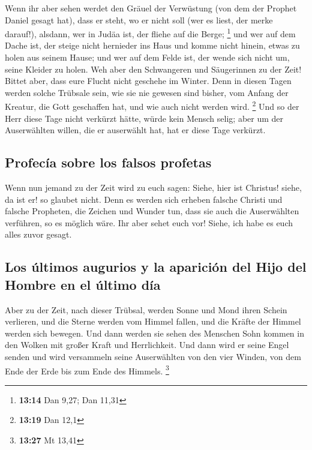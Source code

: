 Wenn ihr aber sehen werdet den Gräuel der Verwüstung
(von dem der Prophet Daniel gesagt hat), dass er steht, wo er nicht soll
(wer es liest, der merke darauf!), alsdann, wer in Judäa ist, der fliehe
auf die Berge; \footnote{\textbf{13:14} Dan 9,27; Dan 11,31}
 und wer auf dem Dache ist, der steige nicht hernieder
ins Haus und komme nicht hinein, etwas zu holen aus seinem Hause;
 und wer auf dem Felde ist, der wende sich nicht um,
seine Kleider zu holen.  Weh aber den Schwangeren und
Säugerinnen zu der Zeit!  Bittet aber, dass eure Flucht
nicht geschehe im Winter.  Denn in diesen Tagen werden
solche Trübsale sein, wie sie nie gewesen sind bisher, vom Anfang der
Kreatur, die Gott geschaffen hat, und wie auch nicht werden wird.
\footnote{\textbf{13:19} Dan 12,1}  Und so der Herr diese
Tage nicht verkürzt hätte, würde kein Mensch selig; aber um der
Auserwählten willen, die er auserwählt hat, hat er diese Tage verkürzt.

\hypertarget{profecuxeda-sobre-los-falsos-profetas}{%
\subsection{Profecía sobre los falsos
profetas}\label{profecuxeda-sobre-los-falsos-profetas}}

 Wenn nun jemand zu der Zeit wird zu euch sagen: Siehe,
hier ist Christus! siehe, da ist er! so glaubet nicht. 
Denn es werden sich erheben falsche Christi und falsche Propheten, die
Zeichen und Wunder tun, dass sie auch die Auserwählten verführen, so es
möglich wäre.  Ihr aber sehet euch vor! Siehe, ich habe
es euch alles zuvor gesagt.

\hypertarget{los-uxfaltimos-augurios-y-la-apariciuxf3n-del-hijo-del-hombre-en-el-uxfaltimo-duxeda}{%
\subsection{Los últimos augurios y la aparición del Hijo del Hombre en
el último
día}\label{los-uxfaltimos-augurios-y-la-apariciuxf3n-del-hijo-del-hombre-en-el-uxfaltimo-duxeda}}

 Aber zu der Zeit, nach dieser Trübsal, werden Sonne und
Mond ihren Schein verlieren,  und die Sterne werden vom
Himmel fallen, und die Kräfte der Himmel werden sich bewegen.
 Und dann werden sie sehen des Menschen Sohn kommen in
den Wolken mit großer Kraft und Herrlichkeit.  Und dann
wird er seine Engel senden und wird versammeln seine Auserwählten von
den vier Winden, von dem Ende der Erde bis zum Ende des Himmels.
\footnote{\textbf{13:27} Mt 13,41}

